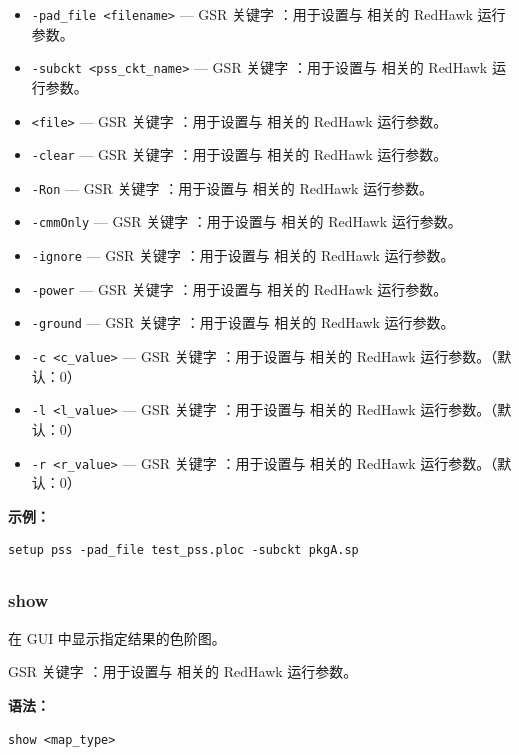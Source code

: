 \begin{itemize}
\item \texttt{-pad\_file <filename>} — GSR 关键字 ：用于设置与  相关的 RedHawk 运行参数。
\item \texttt{-subckt <pss\_ckt\_name>} — GSR 关键字 ：用于设置与  相关的 RedHawk 运行参数。
\item \texttt{<file>} — GSR 关键字 ：用于设置与  相关的 RedHawk 运行参数。
\item \texttt{-clear} — GSR 关键字 ：用于设置与  相关的 RedHawk 运行参数。
\item \texttt{-Ron} — GSR 关键字 ：用于设置与  相关的 RedHawk 运行参数。
\item \texttt{-cmmOnly} — GSR 关键字 ：用于设置与  相关的 RedHawk 运行参数。
\item \texttt{-ignore} — GSR 关键字 ：用于设置与  相关的 RedHawk 运行参数。
\item \texttt{-power} — GSR 关键字 ：用于设置与  相关的 RedHawk 运行参数。
\item \texttt{-ground} — GSR 关键字 ：用于设置与  相关的 RedHawk 运行参数。
\item \texttt{-c <c\_value>} — GSR 关键字 ：用于设置与  相关的 RedHawk 运行参数。（默认：0）
\item \texttt{-l <l\_value>} — GSR 关键字 ：用于设置与  相关的 RedHawk 运行参数。（默认：0）
\item \texttt{-r <r\_value>} — GSR 关键字 ：用于设置与  相关的 RedHawk 运行参数。（默认：0）
\end{itemize}

\textbf{示例：}
\begin{lstlisting}
setup pss -pad_file test_pss.ploc -subckt pkgA.sp
\end{lstlisting}

\subsection{}
\subsubsection*{show}

在 GUI 中显示指定结果的色阶图。

GSR 关键字 ：用于设置与  相关的 RedHawk 运行参数。

\textbf{语法：}
\begin{lstlisting}
show <map_type>
\end{lstlisting}

\subsection{}
